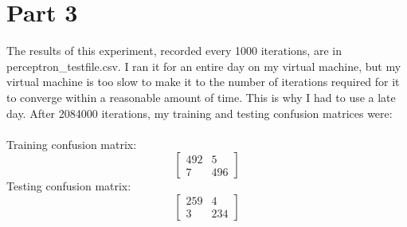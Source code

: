 \documentclass[10pt]{amsart}
\begin{document}
\section{Part 3}
The results of this experiment, recorded every 1000 iterations, are in perceptron\_testfile.csv.  I ran it for an entire day on my virtual machine, but my virtual machine is too slow to make it to the number of iterations required for it to converge within a reasonable amount of time.  This is why I had to use a late day.
After 2084000 iterations, my training and testing confusion matrices were:\\\\
Training confusion matrix:
\[
\begin{bmatrix}
492 & 5 \\
7 & 496
\end{bmatrix}
\]
Testing confusion matrix:
\[
\begin{bmatrix}
259 & 4 \\
3 & 234
\end{bmatrix}
\]
\end{document}
